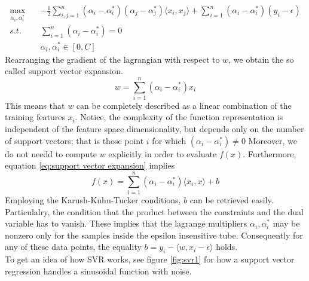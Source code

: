 \begin{equation}
    \begin{aligned}
        \max_{\alpha_i, \alpha_i^*} \quad& -\frac{1}{2}\sum\limits_{i,j=1}^n(\alpha_i-\alpha_i^*)(\alpha_j-\alpha_j^*)\langle x_i,x_j\rangle +\sum\limits_{i=1}^n(\alpha_i-\alpha_i^*)(y_i-\epsilon)
        \\
        s.t. \quad& \sum\limits_{i=1}^n(\alpha_i-\alpha_i^*)=0
        \\
        \quad& \alpha_i, \alpha_i^* \in [0, C]
    \end{aligned}
\end{equation}
Rearranging the gradient of the lagrangian with respect to $w$, we obtain the so called support vector expansion.
\begin{equation}\label{eq:support vector expansion}
    w=\sum\limits_{i=1}^n(\alpha_i-\alpha_i^*)x_i
\end{equation}
This means that $w$ can be completely described as a linear combination of the training features $x_i$.
Notice, the complexity of the function representation is independent of the feature space dimensionality, but depends only on the number of support vectors; that is those point $i$ for which $(\alpha_i-\alpha_i^*)\neq 0$
Moreover, we do not needd to compute $w$ explicitly in order to evaluate $f(x)$.
Furthermore, equation \ref{eq:support vector expansion} implies
\begin{equation}
    f(x)=\sum\limits_{i=1}^n(\alpha_i-\alpha_i^*)\langle x_i, x\rangle +b
\end{equation}
Employing the Karush-Kuhn-Tucker conditions, $b$ can be retrieved easily. Particulalry, the condition that the product between the constraints and the dual variable has to vanish. These implies that the lagrange multipliers $\alpha_i, \alpha_i^*$ may be nonzero only for the samples inside the epsilon insensitive tube. Consequently for any of these data points, the equality $b=y_i-\langle w, x_i-\epsilon\rangle$ holds.
\\
To get an idea of how SVR works, see figure \ref{fig:svr1} for how a support vector regression handles a sinusoidal function with noise.
\\
